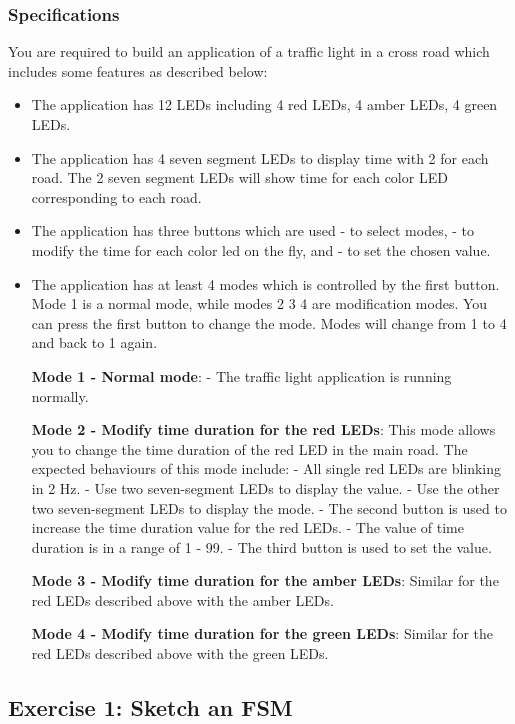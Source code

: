 \subsubsection{Specifications}
You are required to build an application of a traffic light in a cross road which includes some features as described below:
\begin{itemize}
    \item The application has 12 LEDs including 4 red LEDs, 4 amber LEDs, 4 green LEDs.
    \item The application has 4 seven segment LEDs to display time with 2 for each road. The 2 seven segment LEDs will show time for each color LED corresponding to each road.
    \item The application has three buttons which are used
    \subitem - to select modes, 
    \subitem - to modify the time for each color led on the fly, and 
    \subitem - to set the chosen value. 
    \item The application has at least 4 modes which is controlled by the first button. Mode 1 is a normal mode, while modes 2 3 4 are  modification modes. You can press the first button to change the mode. Modes will change from 1 to 4 and back to 1 again. 
    
    \textbf{Mode 1 - Normal mode}: 
    \subitem - The traffic light application is running normally.   
    
    \textbf{Mode 2 - Modify time duration for the red LEDs}: This mode allows you to change the time duration of the red LED in the main road. The expected behaviours of this mode include:  
    \subitem - All single red LEDs are blinking in 2 Hz. 
    \subitem - Use two seven-segment LEDs to display the value.
    \subitem - Use the other two seven-segment LEDs to display the mode.
    \subitem - The second button is used to increase the time duration value for the red LEDs. 
    \subitem - The value of time duration is in a range of 1 - 99. 
    \subitem - The third button is used to set the value.
    
    
    \textbf{Mode 3 - Modify time duration for the amber LEDs}: Similar for the red LEDs described above with the amber LEDs.
    
    
    \textbf{Mode 4 - Modify time duration for the green LEDs}: Similar for the red LEDs described above with the green LEDs.
\end{itemize}

\newpage
\subsection*{Exercise 1: Sketch an FSM}

